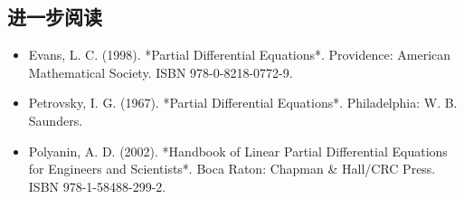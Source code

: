 \subsection{进一步阅读}  
\begin{itemize}
\item Evans, L. C. (1998). *Partial Differential Equations*. Providence: American Mathematical Society. ISBN 978-0-8218-0772-9.  
\item Petrovsky, I. G. (1967). *Partial Differential Equations*. Philadelphia: W. B. Saunders.  
\item Polyanin, A. D. (2002). *Handbook of Linear Partial Differential Equations for Engineers and Scientists*. Boca Raton: Chapman & Hall/CRC Press. ISBN 978-1-58488-299-2.
\end{itemize}